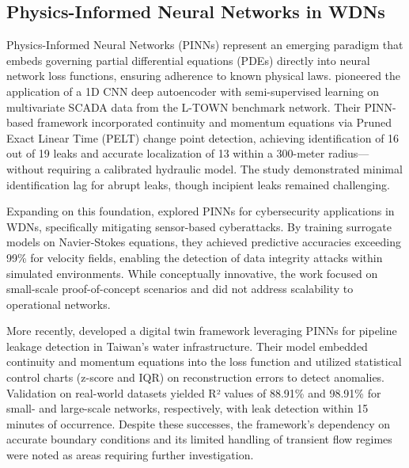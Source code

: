 \documentclass[final,5p,times,twocolumn,authoryear]{elsarticle}
\begin{document}
\subsection{Physics-Informed Neural Networks in WDNs}

Physics-Informed Neural Networks (PINNs) represent an emerging paradigm that embeds governing partial differential equations (PDEs) directly into neural network loss functions, ensuring adherence to known physical laws. \cite{TORNYEVIADZI2023106062} pioneered the application of a 1D CNN deep autoencoder with semi-supervised learning on multivariate SCADA data from the L-TOWN benchmark network. Their PINN-based framework incorporated continuity and momentum equations via Pruned Exact Linear Time (PELT) change point detection, achieving identification of 16 out of 19 leaks and accurate localization of 13 within a 300-meter radius—without requiring a calibrated hydraulic model. The study demonstrated minimal identification lag for abrupt leaks, though incipient leaks remained challenging.

Expanding on this foundation, \cite{falas2020pinnwatersecurity} explored PINNs for cybersecurity applications in WDNs, specifically mitigating sensor-based cyberattacks. By training surrogate models on Navier-Stokes equations, they achieved predictive accuracies exceeding 99\% for velocity fields, enabling the detection of data integrity attacks within simulated environments. While conceptually innovative, the work focused on small-scale proof-of-concept scenarios and did not address scalability to operational networks.

More recently, \cite{lin2025digitaltwin} developed a digital twin framework leveraging PINNs for pipeline leakage detection in Taiwan's water infrastructure. Their model embedded continuity and momentum equations into the loss function and utilized statistical control charts (z-score and IQR) on reconstruction errors to detect anomalies. Validation on real-world datasets yielded R² values of 88.91\% and 98.91\% for small- and large-scale networks, respectively, with leak detection within 15 minutes of occurrence. Despite these successes, the framework's dependency on accurate boundary conditions and its limited handling of transient flow regimes were noted as areas requiring further investigation.



\end{document}
